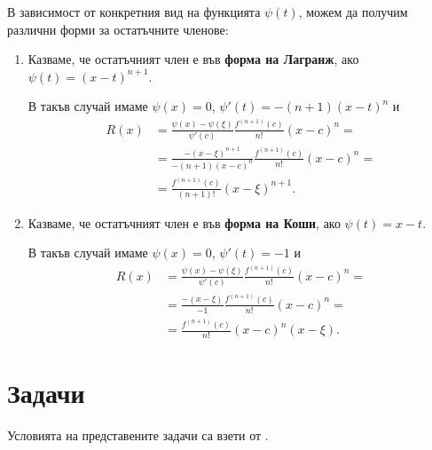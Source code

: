 \documentclass{../../common/topic}
\begin{document}
В зависимост от конкретния вид на функцията \( \psi(t) \), можем да получим различни форми за остатъчните членове:
\begin{enumerate}
  \item Казваме, че остатъчният член е във \textbf{форма на Лагранж}, ако \( \psi(t) = {(x-t)}^{n+1} \).

  В такъв случай имаме \( \psi(x) = 0 \), \( \psi'(t) = -(n+1) {(x-t)}^n \) и
  \begin{align*}
    R(x)
    &=
    \frac {\psi(x) - \psi(\xi)} {\psi'(c)} \frac {f^{(n+1)}(c)} {n!} {(x-c)}^n
    = \\ &=
    \frac {-{(x-\xi)}^{n+1}} {-(n+1) {(x-c)}^n} \frac {f^{(n+1)}(c)} {n!} {(x-c)}^n
    = \\ &=
    \boxed{\frac {f^{(n+1)}(c)} {(n+1)!} {(x-\xi)}^{n+1}}.
  \end{align*}

  \item Казваме, че остатъчният член е във \textbf{форма на Коши}, ако \( \psi(t) = x-t \).

  В такъв случай имаме \( \psi(x) = 0 \), \( \psi'(t) = -1 \) и
  \begin{align*}
    R(x)
    &=
    \frac {\psi(x) - \psi(\xi)} {\psi'(c)} \frac {f^{(n+1)}(c)} {n!} {(x-c)}^n
    = \\ &=
    \frac {-(x-\xi)} {-1} \frac {f^{(n+1)}(c)} {n!} {(x-c)}^n
    = \\ &=
    \boxed{\frac {f^{(n+1)}(c)} {n!} {(x-c)}^n {(x-\xi)}}.
  \end{align*}
\end{enumerate}

\section{Задачи}

Условията на представените задачи са взети от \cite{Syllabus}.
\end{document}
